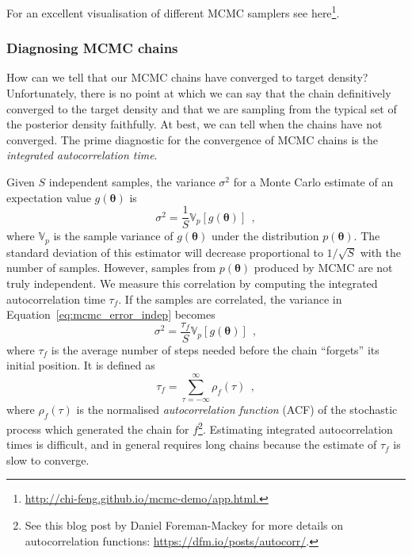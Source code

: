 \documentclass[12pt,dvipsnames]{report}
\renewcommand{\vec}[1]{\boldsymbol{\mathbf{#1}}}
\newcommand{\hquad}{~~}
\begin{document}
For an excellent visualisation of different MCMC samplers see 
here\footnote{\url{http://chi-feng.github.io/mcmc-demo/app.html.}}.

\subsubsection{Diagnosing MCMC chains}
How can we tell that our MCMC chains have converged to target density?
Unfortunately, there is no point at which we can say that the chain definitively
converged to the target density and that we are sampling from the typical set of 
the posterior density faithfully. At best, we can
tell when the chains have not converged. The prime diagnostic for the convergence
of MCMC chains is the \emph{integrated autocorrelation time}.

Given $S$ independent samples, the variance $\sigma^2$ for a Monte Carlo 
estimate of an expectation value $g(\vec\theta)$  is 
\begin{equation}
    \sigma^2= \frac{1}{S} \mathbb{V}_{p}\left[g(\vec\theta)\right]
    \hquad,
    \label{eq:mcmc_error_indep}
\end{equation}
where $\mathbb{V}_{p}$ is the sample variance of $g(\vec\theta)$ under the 
distribution $p(\vec\theta)$.
The standard deviation of this estimator will decrease proportional to
$1/\sqrt{S}$ with the number of samples.
However, samples from $p(\vec\theta)$ produced by MCMC are not truly independent.
We measure this correlation by computing the integrated autocorrelation
time $\tau_f$. If the samples are correlated, the variance in 
Equation~\ref{eq:mcmc_error_indep} becomes
\begin{equation}
    \sigma^2= \frac{\tau_f}{S} \mathbb{V}_{p}\left[g(\vec\theta)\right]
    \hquad,
    \label{eq:mcmc_error}
\end{equation}
where $\tau_f$ is the average number of steps needed before the chain ``forgets''
its initial position. It is defined as
\begin{equation}
    \tau_f = \sum_{\tau=-\infty}^\infty\rho_f(\tau)
    \hquad,
\end{equation}
where $\rho_f(\tau)$ is the normalised \emph{autocorrelation function} (ACF) of 
the stochastic process which  generated the chain for
$f$\footnote{See this blog post by Daniel Foreman-Mackey for more details on 
autocorrelation functions: \url{https://dfm.io/posts/autocorr/}.}.
Estimating integrated autocorrelation times is difficult, and in general
requires long chains because the estimate of $\tau_f$ is slow to converge.
\end{document}
